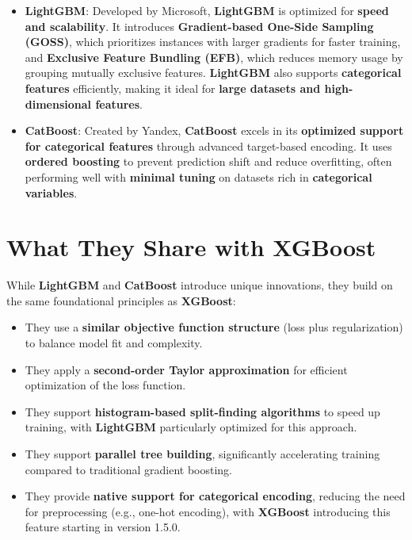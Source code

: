 \documentclass[
  letterpaper,
  DIV=11,
  numbers=noendperiod]{scrreprt}
\providecommand{\tightlist}{%
  \setlength{\itemsep}{0pt}\setlength{\parskip}{0pt}}\usepackage{longtable,booktabs,array}
\begin{document}
\begin{itemize}
\item
  \textbf{LightGBM}: Developed by Microsoft, \textbf{LightGBM} is
  optimized for \textbf{speed and scalability}. It introduces
  \textbf{Gradient-based One-Side Sampling (GOSS)}, which prioritizes
  instances with larger gradients for faster training, and
  \textbf{Exclusive Feature Bundling (EFB)}, which reduces memory usage
  by grouping mutually exclusive features. \textbf{LightGBM} also
  supports \textbf{categorical features} efficiently, making it ideal
  for \textbf{large datasets and high-dimensional features}.
\item
  \textbf{CatBoost}: Created by Yandex, \textbf{CatBoost} excels in its
  \textbf{optimized support for categorical features} through advanced
  target-based encoding. It uses \textbf{ordered boosting} to prevent
  prediction shift and reduce overfitting, often performing well with
  \textbf{minimal tuning} on datasets rich in \textbf{categorical
  variables}.
\end{itemize}

\section{What They Share with
XGBoost}\label{what-they-share-with-xgboost}

While \textbf{LightGBM} and \textbf{CatBoost} introduce unique
innovations, they build on the same foundational principles as
\textbf{XGBoost}:

\begin{itemize}
\tightlist
\item
  They use a \textbf{similar objective function structure} (loss plus
  regularization) to balance model fit and complexity.
\item
  They apply a \textbf{second-order Taylor approximation} for efficient
  optimization of the loss function.
\item
  They support \textbf{histogram-based split-finding algorithms} to
  speed up training, with \textbf{LightGBM} particularly optimized for
  this approach.
\item
  They support \textbf{parallel tree building}, significantly
  accelerating training compared to traditional gradient boosting.
\item
  They provide \textbf{native support for categorical encoding},
  reducing the need for preprocessing (e.g., one-hot encoding), with
  \textbf{XGBoost} introducing this feature starting in version 1.5.0.
\end{itemize}
\end{document}
